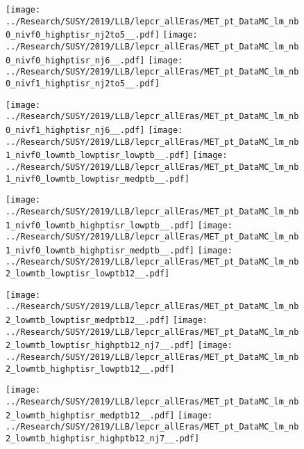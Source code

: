 
\begin{figure}[!htb]
  \texttt{[image: ../Research/SUSY/2019/LLB/lepcr\_allEras/MET\_pt\_DataMC\_lm\_nb0\_nivf0\_highptisr\_nj2to5\_\_.pdf]}
\endminipage\hfill
{}
  \texttt{[image: ../Research/SUSY/2019/LLB/lepcr\_allEras/MET\_pt\_DataMC\_lm\_nb0\_nivf0\_highptisr\_nj6\_\_.pdf]}
\endminipage\hfill
{}
  \texttt{[image: ../Research/SUSY/2019/LLB/lepcr\_allEras/MET\_pt\_DataMC\_lm\_nb0\_nivf1\_highptisr\_nj2to5\_\_.pdf]}
\endminipage
\end{figure}

\begin{figure}[!htb]
  \texttt{[image: ../Research/SUSY/2019/LLB/lepcr\_allEras/MET\_pt\_DataMC\_lm\_nb0\_nivf1\_highptisr\_nj6\_\_.pdf]}
\endminipage\hfill
{}
  \texttt{[image: ../Research/SUSY/2019/LLB/lepcr\_allEras/MET\_pt\_DataMC\_lm\_nb1\_nivf0\_lowmtb\_lowptisr\_lowptb\_\_.pdf]}
\endminipage\hfill
{}
  \texttt{[image: ../Research/SUSY/2019/LLB/lepcr\_allEras/MET\_pt\_DataMC\_lm\_nb1\_nivf0\_lowmtb\_lowptisr\_medptb\_\_.pdf]}
\endminipage
\end{figure}

\begin{figure}[!htb]
  \texttt{[image: ../Research/SUSY/2019/LLB/lepcr\_allEras/MET\_pt\_DataMC\_lm\_nb1\_nivf0\_lowmtb\_highptisr\_lowptb\_\_.pdf]}
\endminipage\hfill
{}
  \texttt{[image: ../Research/SUSY/2019/LLB/lepcr\_allEras/MET\_pt\_DataMC\_lm\_nb1\_nivf0\_lowmtb\_highptisr\_medptb\_\_.pdf]}
\endminipage\hfill
{}
  \texttt{[image: ../Research/SUSY/2019/LLB/lepcr\_allEras/MET\_pt\_DataMC\_lm\_nb2\_lowmtb\_lowptisr\_lowptb12\_\_.pdf]}
\endminipage
\end{figure}

\begin{figure}[!htb]
  \texttt{[image: ../Research/SUSY/2019/LLB/lepcr\_allEras/MET\_pt\_DataMC\_lm\_nb2\_lowmtb\_lowptisr\_medptb12\_\_.pdf]}
\endminipage\hfill
{}
  \texttt{[image: ../Research/SUSY/2019/LLB/lepcr\_allEras/MET\_pt\_DataMC\_lm\_nb2\_lowmtb\_lowptisr\_highptb12\_nj7\_\_.pdf]}
\endminipage\hfill
{}
  \texttt{[image: ../Research/SUSY/2019/LLB/lepcr\_allEras/MET\_pt\_DataMC\_lm\_nb2\_lowmtb\_highptisr\_lowptb12\_\_.pdf]}
\endminipage
\end{figure}

\begin{figure}[!htb]
  \texttt{[image: ../Research/SUSY/2019/LLB/lepcr\_allEras/MET\_pt\_DataMC\_lm\_nb2\_lowmtb\_highptisr\_medptb12\_\_.pdf]}
\endminipage\hfill
{}
  \texttt{[image: ../Research/SUSY/2019/LLB/lepcr\_allEras/MET\_pt\_DataMC\_lm\_nb2\_lowmtb\_highptisr\_highptb12\_nj7\_\_.pdf]}
\endminipage
\end{figure}